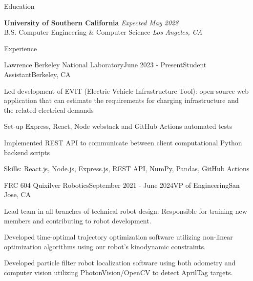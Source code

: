 \documentclass[
	11pt, %
]{tex/resume} %
\begin{document}

\begin{rSection}{Education}
	
	\textbf{University of Southern California} \hfill \textit{Expected May 2028} \\ 
	B.S. Computer Engineering \& Computer Science \hfill \textit{Los Angeles, CA}
	
\end{rSection}


\begin{rSection}{Experience}

	\begin{rSubsection}{Lawrence Berkeley National Laboratory}{June 2023 - Present}{Student Assistant}{Berkeley, CA}
		\item Led development of EVIT (Electric Vehicle Infrastructure Tool): open-source web application that can estimate the requirements for charging infrastructure and the related electrical demands
        \item Set-up Express, React, Node webstack and GitHub Actions automated tests
        \item Implemented REST API to communicate between client computational Python backend scripts
        \item Skills: React.js, Node.js, Express.js, REST API, NumPy, Pandas, GitHub Actions
        
	\end{rSubsection}


	\begin{rSubsection}{FRC 604 Quixilver Robotics}{September 2021 - June 2024}{VP of Engineering}{San Jose, CA}
		\item Lead team in all branches of technical robot design. Responsible for training new members and contributing to robot development.
        \item Developed time-optimal trajectory optimization software utilizing non-linear optimization algorithms using our robot’s kinodynamic constraints.
        \item Developed particle filter robot localization software using both odometry and computer vision utilizing PhotonVision/OpenCV to detect AprilTag targets.
        
	\end{rSubsection}





\end{rSection}
\end{document}
